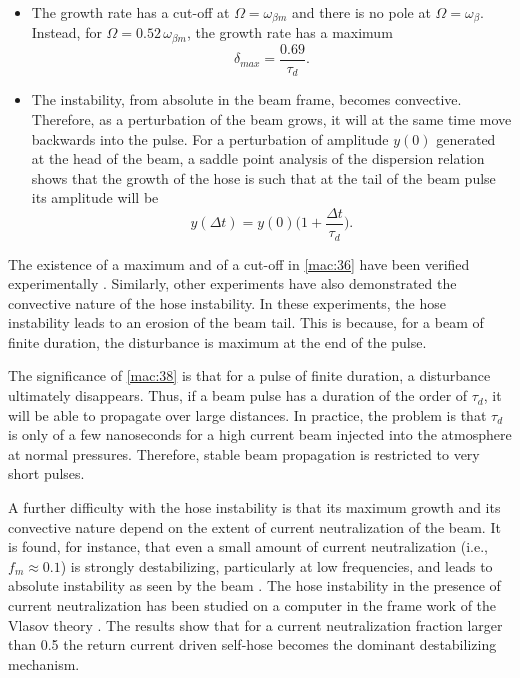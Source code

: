 \documentclass [12pt,a4paper,     ]{report} %
\begin{document}
\begin{itemize}

	\item The growth rate has a cut-off at $\Omega=\omega_{\beta m}$ and there is no pole at $\Omega=\omega_\beta$.  Instead, for $\Omega=0.52\,\omega_{\beta m}$, the growth rate has a maximum
%
\begin{equation}\label{mac:37} %
            \delta_{max} =  \frac{0.69}{\tau_d}.
\end{equation}
%

	\item The instability, from absolute in the beam frame, becomes convective.  Therefore, as a perturbation of the beam grows, it will at the same time move backwards into the pulse.  For a perturbation of amplitude $y(0)$ generated at the head of the beam, a saddle point analysis of the dispersion relation \cite{LEE--1978-} shows that the growth of the hose is such that at the tail of the beam pulse its amplitude will be 
%
\begin{equation}\label{mac:38} %
     y(\Delta t) = y(0) \bigl(1 + \frac{\Delta t}{\tau_d}  \bigr).
\end{equation}
%
\end{itemize}

	The existence of a maximum and of a cut-off in \eqref{mac:36} have been verified experimentally \cite{LAUER1978-}.  Similarly, other experiments \cite{BRIGG1977-} have also demonstrated the convective nature of the hose instability.  In these experiments, the hose instability leads to an erosion of the beam tail.  This is because, for a beam of finite duration, the disturbance is maximum at the end of the pulse.

	The significance of \eqref{mac:38} is that for a pulse of finite duration, a disturbance ultimately disappears.  Thus, if a beam pulse has a duration of the order of $\tau_d$, it will be able to propagate over large distances. In practice, the problem is that $\tau_d$ is only of a few nanoseconds for a high current beam injected into the atmosphere at normal pressures.  Therefore, stable beam propagation is restricted to very short pulses.

	A further difficulty with the hose instability is that its maximum growth and its convective nature depend on the extent of current neutralization of the beam.  It is found, for instance, that even a small amount of current neutralization (i.e., $f_m\approx 0.1$) is strongly destabilizing, particularly at low frequencies, and leads to absolute instability as seen by the beam \cite{UHM--1980-}.   The hose instability in the presence of current neutralization has been studied on a computer in the frame work of the Vlasov theory \cite{LAMPE1981-}.  The results show that for a current neutralization fraction larger than 0.5 the return current driven self-hose becomes the dominant destabilizing mechanism.
\end{document}
